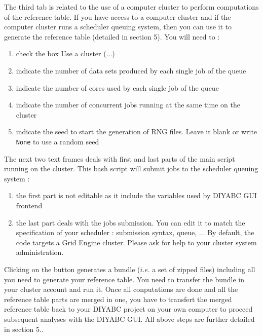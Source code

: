 \label{clustergui} The third tab is related to the use of a computer
cluster to perform computations of the reference table. If you have
access to a computer cluster and if the computer cluster runs a scheduler
queuing system, then you can use it to generate the reference table
(detailed in section 5). You will need to :
\begin{enumerate}
\item check the box \textsf{Use a cluster (...)}
\item indicate the number of data sets produced by each single job of the
queue
\item indicate the number of cores used by each single job of the queue
\item indicate the number of concurrent jobs running at the same time on
the cluster
\item indicate the seed to start the generation of RNG files. Leave it blank
or write \texttt{None} to use a random seed
\end{enumerate}
The next two text frames deals with first and last parts of the main
script running on the cluster. This bash script will submit jobs to
the scheduler queuing system :
\begin{enumerate}
\item the first part is not editable as it include the variables used by
DIYABC GUI frontend
\item the last part deals with the jobs submission. You can edit it to match
the specification of your scheduler : submission syntax, queue, ...
By default, the code targets a Grid Engine cluster. Please ask for
help to your cluster system administration.
\end{enumerate}
Clicking on the  button generates
a bundle ($i.e.$ a set of zipped files) including all you need to
generate your reference table. You need to transfer the bundle in
your cluster account and run it. Once all conputations are done and
all the reference table parts are merged in one, you have to transfert
the merged reference table back to your DIYABC project on your own
computer to proceed subsequent analyses with the DIYABC GUI. All above
steps are further detailed in section 5..

